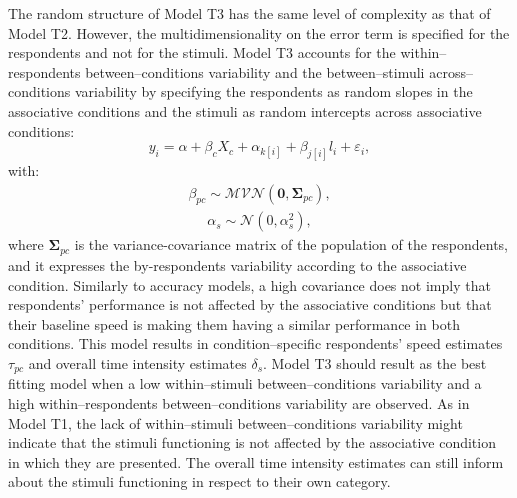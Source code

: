 \documentclass[12pt]{book}
\begin{document}
The random structure of Model T3 has the same level of complexity as that of Model T2. However, the multidimensionality on the error term is specified for the respondents and not for the stimuli. 
Model T3 accounts for the within--respondents between--conditions variability and the between--stimuli across--conditions variability by specifying the respondents as random slopes in the associative conditions and the stimuli as random intercepts across associative conditions: 
%
\begin{equation}\label{logtime3}
	y_{i} = \alpha + \beta_cX_c + \alpha_{k[i]} +  \beta_{j[i]}l_{i} + \varepsilon_{i},
\end{equation}
with:
\begin{align}
	\beta_{pc} \sim \mathcal{MVN}(\bm{0}, \bm{\Sigma}_{pc}),
\end{align}
\begin{align}
	\alpha_s \sim \mathcal{N} (0, \alpha_s^2),
\end{align}
%
where $\bm{\Sigma}_{pc}$ is the variance-covariance matrix of the population of the respondents, and it expresses the by-respondents variability according to the associative condition. Similarly to accuracy models, a high covariance does not imply that respondents' performance is not affected by the associative conditions but that their baseline speed is making them having a similar performance in both conditions.
This model results in condition--specific respondents' speed estimates $\tau_{pc}$ and overall time intensity estimates $\delta_s$. 
Model T3 should result as the best fitting model when a low within--stimuli between--conditions variability and a high within--respondents between--conditions variability are observed. 
As in Model T1, the lack of within--stimuli between--conditions variability might indicate that the stimuli functioning is not affected by the associative condition in which they are presented. The overall time intensity estimates can still inform about the stimuli functioning in respect to their own category. 
\end{document}
